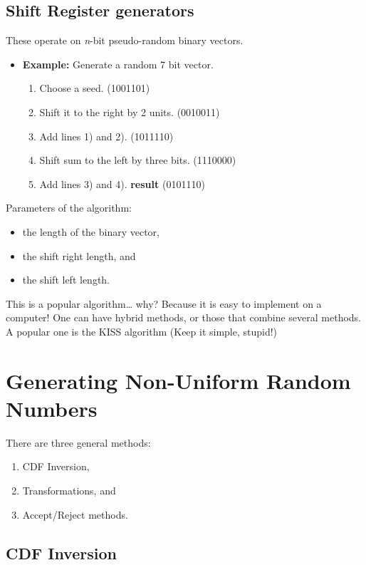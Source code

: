 \documentclass[captions=tableheading]{scrbook}
\begin{document}
\subsection{Shift Register generators}
\label{sec-2_2_2}

These operate on \emph{n}-bit pseudo-random binary vectors.

\begin{itemize}
\item \textbf{Example:} Generate a random 7 bit vector.
\begin{enumerate}
\item Choose a seed. (1001101)
\item Shift it to the right by 2 units. (0010011)
\item Add lines 1) and 2). (1011110)
\item Shift sum to the left by three bits. (1110000)
\item Add lines 3) and 4). \textbf{result} (0101110)
\end{enumerate}
\end{itemize}

Parameters of the algorithm: 

\begin{itemize}
\item the length of the binary vector,
\item the shift right length, and
\item the shift left length.
\end{itemize}

This is a popular algorithm\ldots{} why? Because it is easy to implement on a computer! One can have hybrid methods, or those that combine several methods. A popular one is the KISS algorithm (Keep it simple, stupid!)
\section{Generating Non-Uniform Random Numbers}
\label{sec-2_3}


There are three general methods: 

\begin{enumerate}
\item CDF Inversion,
\item Transformations, and
\item Accept/Reject methods.
\end{enumerate}
\subsection{CDF Inversion}
\label{sec-2_3_1}
\end{document}
